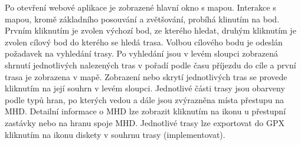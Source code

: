 Po otevření webové aplikace je zobrazené hlavní okno s mapou. Interakce s mapou,
kromě základního posouvání a zvětšování, probíhá klinutím na bod. Prvním
kliknutím je zvolen výchozí bod, ze kterého hledat, druhým kliknutím je zvolen
cílový bod do kterého se hledá trasa. Volbou cílového bodu je odeslán požadavek
na vyhledání trasy. Po vyhledání jsou v levém sloupci zobrazená shrnutí
jednotlivých nalezených tras v pořadí podle času příjezdu do cíle a první trasa
je zobrazena v mapě. Zobrazení nebo skrytí jednotlivých tras se provede
kliknutím na její souhrn v levém sloupci. Jednotlivé části trasy jsou obarveny
podle typů hran, po kterých vedou a dále jsou zvýrazněna místa přestupu na MHD.
Detailní informace o MHD lze zobrazit kliknutím na ikonu u přestupní zastávky
nebo na hranu spoje MHD. Jednotlivé trasy lze exportovat do GPX kliknutím na
ikonu diskety v souhrnu trasy (\TODO implementovat). 
